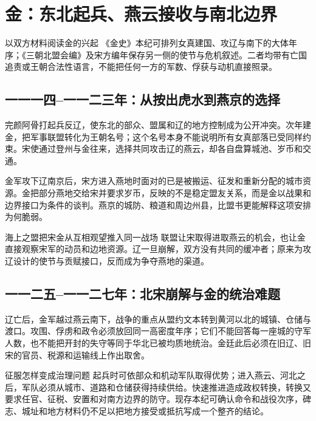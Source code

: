 \section{金：东北起兵、燕云接收与南北边界}

\begin{textwindow}{以双方材料阅读金的兴起}
《金史》本纪可排列女真建国、攻辽与南下的大体年序；《三朝北盟会编》及宋方编年保存另一侧的使节与危机叙述。二者均带有亡国追责或王朝合法性语言，不能把任何一方的军数、俘获与动机直接照录。
\end{textwindow}

\subsection{一一一四--一一二三年：从按出虎水到燕京的选择}
完颜阿骨打起兵反辽，使东北的部众、盟属和辽的地方控制成为公开冲突。次年建金，把军事联盟转化为王朝名号；这个名号本身不能说明所有女真部落已受同样约束。宋使通过登州与金往来，选择共同攻击辽的燕云，却各自盘算城池、岁币和交通。

金军攻下辽南京后，宋方进入燕地时面对的已是被搬运、征发和重新分配的城市资源。金把部分燕地交给宋并要求岁币，反映的不是稳定盟友关系，而是金以战果和边界接口为条件的谈判。燕京的城防、粮道和周边州县，比盟书更能解释这项安排为何脆弱。

\begin{turningpoint}{海上之盟把宋金从互相观望推入同一战场}
联盟让宋取得进取燕云的机会，也让金直接观察宋军的动员和边地资源。辽一旦崩解，双方没有共同的缓冲者；原来为攻辽设计的使节与贡赋接口，反而成为争夺燕地的渠道。
\end{turningpoint}

\subsection{一一二五--一一二七年：北宋崩解与金的统治难题}
辽亡后，金军越过燕云南下，战争的重点从盟约文本转到黄河以北的城镇、仓储与渡口。攻围、俘虏和政令必须放回同一高密度年序；它们不能回答每一座城的守军人数，也不能把开封的失守等同于华北已被均质地统治。金廷此后必须在旧辽、旧宋的官员、税源和运输线上作出取舍。

\begin{causalchain}{征服怎样变成治理问题}
起兵时可依部众和机动军队取得优势；进入燕云、河北之后，军队必须从城市、道路和仓储获得持续供给。快速推进造成政权转换，转换又要求任官、征税、安置和对南方边界的防守。现存本纪可确认命令和战役次序，碑志、城址和地方材料仍不足以把地方接受或抵抗写成一个整齐的结论。
\end{causalchain}

